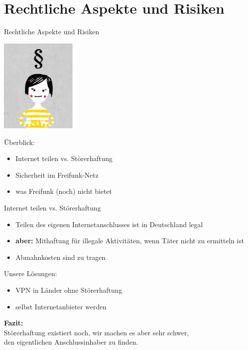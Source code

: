 \documentclass[10pt]{beamer}
\begin{document}
\section{Rechtliche Aspekte und Risiken}
\begin{frame}{Rechtliche Aspekte und Risiken}
\begin{Row}
\begin{Cell}{1}
\vspace{0.1cm}
\includegraphics[width=3.7cm]{images/recht}
\end{Cell}
\begin{Cell}{2}
\vspace{1cm}
Überblick:
\begin{itemize}[<+->]
\item Internet teilen vs. Störerhaftung
\item Sicherheit im Freifunk-Netz
\item was Freifunk (noch) nicht bietet
\end{itemize}
\end{Cell}
\end{Row}
\end{frame}

\begin{frame}{Internet teilen vs. Störerhaftung}
	\begin{itemize}
		\item Teilen des eigenen Internetanschlusses ist in Deutschland legal
		\pause\item \textbf{aber:} Mithaftung für illegale Aktivitäten, wenn Täter nicht zu ermitteln ist
		\pause\item Abmahnkosten sind zu tragen
	\end{itemize}
	
	\vfill
	\pause
	
	Unsere Lösungen:
	\begin{itemize}
		\item VPN in Länder ohne Störerhaftung
		\item selbst Internetanbieter werden
	\end{itemize}
	
	\vfill
	\centering
	\pause \textbf{Fazit:}\\Störerhaftung existiert noch, wir machen es aber sehr schwer,\\den eigentlichen Anschlussinhaber zu finden.

\end{frame}
\end{document}
